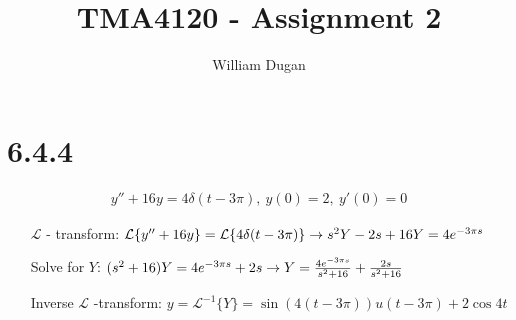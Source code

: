 \documentclass[11pt,a4paper]{article}
\newcommand{\Laplace}{\mathcal{L}}
\begin{document}
\title{TMA4120 - Assignment 2} 
\author{William Dugan}

\maketitle

\section*{6.4.4}
\begin{align*}
    y'' + 16y = 4 \delta (t-3\pi),\ y(0) = 2,\ y'(0) = 0
\end{align*}
\begin{itemize}[leftmargin=4.0cm,labelsep=0.5cm]
\item[$\Laplace$ - transform:]
    $\Laplace\{y'' + 16y\} = \Laplace\{4 \delta (t-3\pi)\} \\
    \rightarrow s^2 Y - 2s + 16Y = 4e^{-3\pi s}$ 
\item[Solve for $Y$:]
    $(s^2 + 16) Y = 4e^{-3\pi s} + 2s \\
    \rightarrow Y = \frac{4e^{-3\pi s}}{s^2 +16} + \frac{2s}{s^2 + 16}$
\item[Inverse $\Laplace$ -transform:]
    $y = \Laplace^{-1}\{Y\}
    = \sin(4(t-3\pi)) u(t-3\pi) + 2\cos 4t$
\end{itemize}
\end{document}
